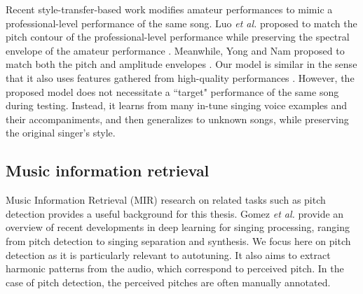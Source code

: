 Recent style-transfer-based work modifies amateur performances to mimic a professional-level performance of the same song. Luo \textit{et al.} proposed to match the pitch contour of the professional-level performance while preserving the spectral envelope of the amateur performance \cite{luo2018singing}. Meanwhile, Yong and Nam proposed to match both the pitch and amplitude envelopes \cite{yong2018singing}. Our model is similar in the sense that it also uses features gathered from high-quality performances \cite{wager2018intonation}. However, the proposed model does not necessitate a ``target" performance of the same song during testing. Instead, it learns from many in-tune singing voice examples and their accompaniments, and then generalizes to unknown songs, while preserving the original singer's style.

\subsection{Music information retrieval}
Music Information Retrieval (MIR) research on related tasks such as pitch detection provides a useful background for this thesis. Gomez {\it et al.}\cite{gomez2018deep} provide an overview of recent developments in deep learning for singing processing, ranging from pitch detection to singing separation and synthesis. We focus here on pitch detection as it is particularly relevant to autotuning. It also aims to extract harmonic patterns from the audio, which correspond to perceived pitch. In the case of pitch detection, the perceived pitches are often manually annotated. 

